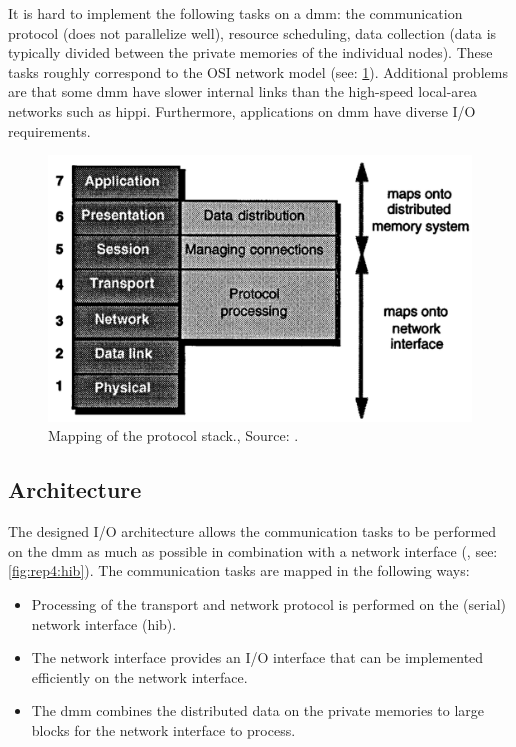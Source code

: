 It is hard to implement the following tasks on a \ac{dmm}: the communication protocol (does not parallelize well), resource scheduling, data collection (data is typically divided between the private memories of the individual nodes). 
These tasks roughly correspond to the OSI network model (see: \cref{fig:rep4:osi}).
Additional problems are that some \acs{dmm} have slower internal links than the high-speed local-area networks such as \ac{hippi}.
Furthermore, applications on \ac{dmm} have diverse I/O requirements.

\begin{figure}
    \centering
	\includegraphics[width=0.95\linewidth]{Figures/Rep4OSI.png}
	\caption{Mapping of the protocol stack., Source: \cite{steenkiste1997high}.} 
    \label{fig:rep4:osi}
\end{figure}

\subsection{Architecture}
The designed I/O architecture allows the communication tasks to be performed on the \ac{dmm} as much as possible in combination with a network interface (, see: \cref{fig:rep4:hib}).
The communication tasks are mapped in the following ways:
\begin{itemize}
    \item Processing of the transport and network protocol is performed on the (serial) network interface (\ac{hib}).
    \item The network interface provides an I/O interface that can be implemented efficiently on the network interface.
    \item The \ac{dmm} combines the distributed data on the private memories to large blocks for the network interface to process.
\end{itemize}

